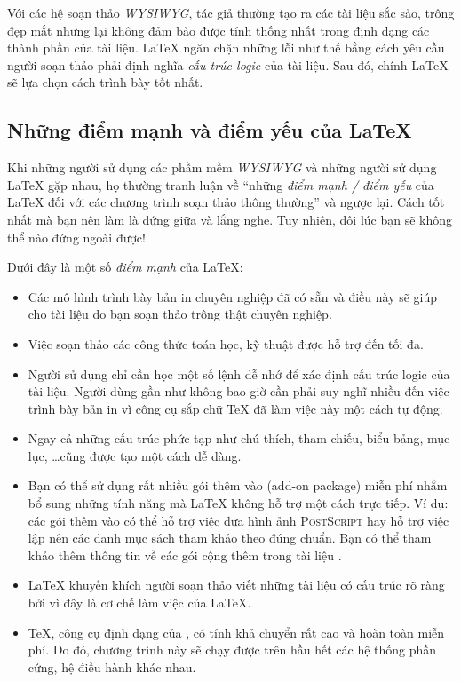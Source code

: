Với các hệ soạn thảo \emph{WYSIWYG}, tác giả thường tạo ra các tài liệu sắc sảo, trông đẹp mắt nhưng lại không đảm bảo được tính thống nhất trong định dạng các thành phần của tài liệu. \LaTeX{} ngăn chặn những lỗi như thế bằng cách yêu cầu người soạn thảo phải định nghĩa \emph{cấu trúc logic} của tài liệu. Sau đó, chính \LaTeX{} sẽ lựa chọn cách trình bày tốt nhất.

\subsection{Những điểm mạnh và điểm yếu của \LaTeX{}}
Khi những người sử dụng các phầm mềm \emph{WYSIWYG} và những người sử dụng LaTeX{} gặp nhau, họ thường tranh luận về ``những \emph{điểm mạnh / điểm yếu} của \LaTeX{} đối với các chương trình soạn thảo thông thường'' và ngược lại. Cách tốt nhất mà bạn nên làm là đứng giữa và lắng nghe. Tuy nhiên, đôi lúc bạn sẽ không thể nào đứng ngoài được!

\medskip\noindent Dưới đây là một số \emph{điểm mạnh} của \LaTeX{}:

\begin{itemize}
\item Các mô hình trình bày bản in chuyên nghiệp đã có sẵn và điều này sẽ giúp cho tài liệu do bạn soạn thảo trông thật chuyên nghiệp.
\item Việc soạn thảo các công thức toán học, kỹ thuật được hỗ trợ đến tối đa.
\item Người sử dụng chỉ cần học một số lệnh dễ nhớ để xác định cấu trúc logic của tài liệu. Người dùng gần như không bao giờ cần phải suy nghĩ nhiều đến việc trình bày bản in vì công cụ sắp chữ  \TeX{} đã làm việc này một cách tự động.
\item Ngay cả những cấu trúc phức tạp như chú thích, tham chiếu, biểu bảng, mục lục, \ldots cũng được tạo một cách dễ dàng.
\item Bạn có thể sử dụng rất nhiều gói thêm vào (add-on package) miễn phí nhằm bổ sung những tính năng mà \LaTeX{} không hỗ trợ một cách trực tiếp. Ví dụ: các gói thêm vào có thể hỗ trợ việc đưa hình ảnh  \textsc{PostScript} hay hỗ trợ việc lập nên các danh mục sách tham khảo theo đúng chuẩn. Bạn có thể tham khảo thêm thông tin về các gói cộng thêm trong tài liệu \companion.
\item \LaTeX{} khuyến khích người soạn thảo viết những tài liệu có cấu trúc rõ ràng bởi vì đây là cơ chế làm việc của \LaTeX{}.
\item \TeX{}, công cụ định dạng của \LaTeXe{}, có tính khả chuyển rất cao và hoàn toàn miễn phí. Do đó, chương trình này sẽ chạy được trên hầu hết các hệ thống phần cứng, hệ điều hành khác nhau.
\end{itemize}

